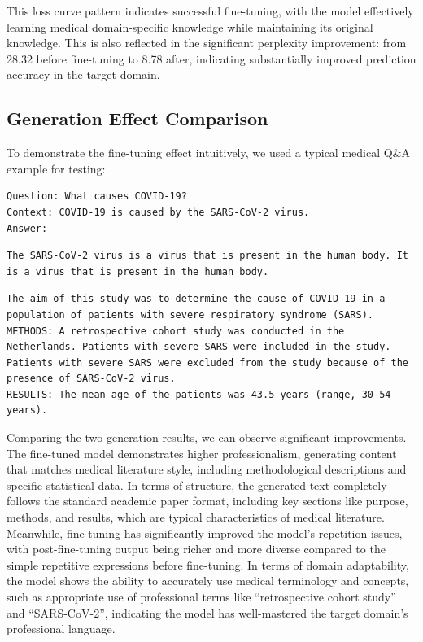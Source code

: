\documentclass[12pt,oneside]{article}
\begin{document}
This loss curve pattern indicates successful fine-tuning, with the model effectively learning medical domain-specific knowledge while maintaining its original knowledge. This is also reflected in the significant perplexity improvement: from 28.32 before fine-tuning to 8.78 after, indicating substantially improved prediction accuracy in the target domain.

\subsection{Generation Effect Comparison}

To demonstrate the fine-tuning effect intuitively, we used a typical medical Q\&A example for testing:

\begin{lstlisting}[caption=Input Prompt]
Question: What causes COVID-19?
Context: COVID-19 is caused by the SARS-CoV-2 virus.
Answer:
\end{lstlisting}

\begin{lstlisting}[caption=Pre-fine-tuning Generation]
The SARS-CoV-2 virus is a virus that is present in the human body. It is a virus that is present in the human body.
\end{lstlisting}

\begin{lstlisting}[caption=Post-fine-tuning Generation]
The aim of this study was to determine the cause of COVID-19 in a population of patients with severe respiratory syndrome (SARS).
METHODS: A retrospective cohort study was conducted in the Netherlands. Patients with severe SARS were included in the study. Patients with severe SARS were excluded from the study because of the presence of SARS-CoV-2 virus.
RESULTS: The mean age of the patients was 43.5 years (range, 30-54 years).
\end{lstlisting}

Comparing the two generation results, we can observe significant improvements. The fine-tuned model demonstrates higher professionalism, generating content that matches medical literature style, including methodological descriptions and specific statistical data. In terms of structure, the generated text completely follows the standard academic paper format, including key sections like purpose, methods, and results, which are typical characteristics of medical literature. Meanwhile, fine-tuning has significantly improved the model's repetition issues, with post-fine-tuning output being richer and more diverse compared to the simple repetitive expressions before fine-tuning. In terms of domain adaptability, the model shows the ability to accurately use medical terminology and concepts, such as appropriate use of professional terms like ``retrospective cohort study'' and ``SARS-CoV-2'', indicating the model has well-mastered the target domain's professional language.
\end{document}
